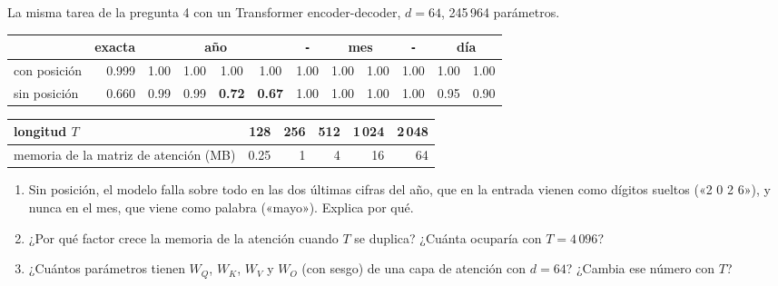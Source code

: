\documentclass[10.5pt,a4paper]{article}
\newcommand{\resp}[1]{\par\vspace{#1}}
\newcommand{\preg}[1]{\vspace{4pt}{\large\bfseries #1}\par\vspace{3pt}}
\begin{document}
\newpage
\preg{6. El Transformer de las fechas y su costo}
La misma tarea de la pregunta 4 con un Transformer encoder-decoder, $d = 64$, 245\,964 parámetros.\par\vspace{4pt}
\begin{center}\small
\begin{tabular}{lrcccccccccc}
\toprule
 & exacta & \multicolumn{4}{c}{año} & \texttt{-} & \multicolumn{2}{c}{mes} & \texttt{-} & \multicolumn{2}{c}{día} \\
\midrule
con posición & 0.999 & 1.00 & 1.00 & 1.00 & 1.00 & 1.00 & 1.00 & 1.00 & 1.00 & 1.00 & 1.00 \\
sin posición & 0.660 & 0.99 & 0.99 & \textbf{0.72} & \textbf{0.67} & 1.00 & 1.00 & 1.00 & 1.00 & 0.95 & 0.90 \\
\bottomrule
\end{tabular}
\par\vspace{6pt}
\begin{tabular}{lrrrrr}
\toprule
longitud $T$ & 128 & 256 & 512 & 1\,024 & 2\,048 \\
\midrule
memoria de la matriz de atención (MB) & 0.25 & 1 & 4 & 16 & 64 \\
\bottomrule
\end{tabular}
\end{center}
\begin{enumerate}
\item Sin posición, el modelo falla sobre todo en las dos últimas cifras del año, que en la entrada vienen como dígitos sueltos («2 0 2 6»), y nunca en el mes, que viene como palabra («mayo»). Explica por qué.\resp{2.2cm}
\item ¿Por qué factor crece la memoria de la atención cuando $T$ se duplica? ¿Cuánta ocuparía con $T = 4\,096$?\resp{1.4cm}
\item ¿Cuántos parámetros tienen $W_Q$, $W_K$, $W_V$ y $W_O$ (con sesgo) de una capa de atención con $d = 64$? ¿Cambia ese número con $T$?\resp{1.4cm}
\end{enumerate}
\end{document}
